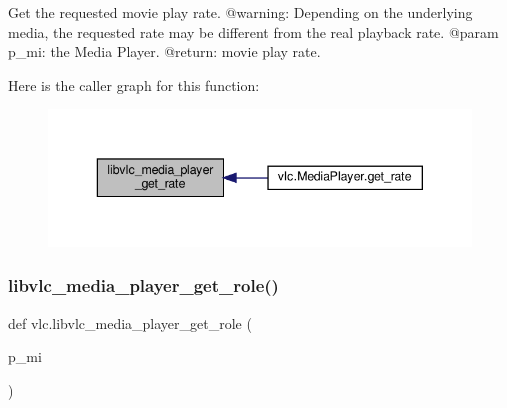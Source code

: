 \begin{DoxyVerb}Get the requested movie play rate.
@warning: Depending on the underlying media, the requested rate may be
different from the real playback rate.
@param p_mi: the Media Player.
@return: movie play rate.
\end{DoxyVerb}
 Here is the caller graph for this function\+:
\nopagebreak
\begin{figure}[H]
\begin{center}
\leavevmode
\includegraphics[width=343pt]{namespacevlc_a3630bafb220ea8c988c4d7c7e4a9f0a6_icgraph}
\end{center}
\end{figure}
\mbox{\label{namespacevlc_a14ecc9df7e469ebd985efdfd70701d1e}} 
\subsubsection{\texorpdfstring{libvlc\+\_\+media\+\_\+player\+\_\+get\+\_\+role()}{libvlc\_media\_player\_get\_role()}}
{\footnotesize\ttfamily def vlc.\+libvlc\+\_\+media\+\_\+player\+\_\+get\+\_\+role (\begin{DoxyParamCaption}\item[{}]{p\+\_\+mi }\end{DoxyParamCaption})}

